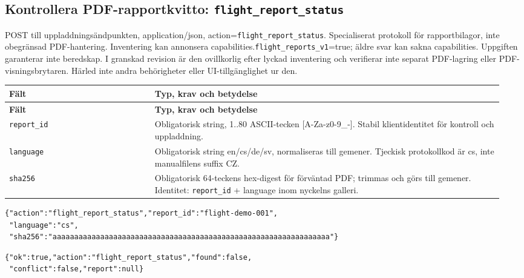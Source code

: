 \documentclass[11pt,a4paper]{article}
\newcommand{\codeword}[1]{\nolinkurl{#1}}
\begin{document}
\subsection{\texorpdfstring{Kontrollera PDF-rapportkvitto: \codeword{flight_report_status}}{Kontrollera PDF-rapportkvitto: flight\_report\_status}}

\label{api352:flight-report-status}

POST till uppladdningsändpunkten, application/json, action=\codeword{flight_report_status}.
Specialiserat protokoll för rapportbilagor, inte obegränsad PDF-hantering. Inventering kan
annonsera capabilities.\codeword{flight_reports_v1}=true; äldre svar kan sakna capabilities.
Uppgiften garanterar inte beredskap. I granskad revision är den ovillkorlig efter lyckad
inventering och verifierar inte separat PDF-lagring eller PDF-visningsbrytaren. Härled inte
andra behörigheter eller UI-tillgänglighet ur den.

\begin{longtable}{@{}>{\RaggedRight\arraybackslash}p{0.28\linewidth}>{\RaggedRight\arraybackslash}p{0.67\linewidth}@{}}
\toprule
\textbf{Fält} & \textbf{Typ, krav och betydelse} \\
\midrule
\endfirsthead
\toprule
\textbf{Fält} & \textbf{Typ, krav och betydelse} \\
\midrule
\endhead
\bottomrule
\endfoot
\codeword{report_id} & Obligatorisk string, 1..80 ASCII-tecken [A-Za-z0-9\_-]. Stabil
klientidentitet för kontroll och uppladdning. \\
\codeword{language} & Obligatorisk string en/cs/de/sv, normaliseras till gemener. Tjeckisk
protokollkod är cs, inte manualfilens suffix CZ. \\
\codeword{sha256} & Obligatorisk 64-teckens hex-digest för förväntad PDF; trimmas och görs
till gemener. Identitet: \codeword{report_id} + language inom nyckelns galleri. \\
\end{longtable}

\begin{lstlisting}[language={}]
{"action":"flight_report_status","report_id":"flight-demo-001",
 "language":"cs",
 "sha256":"aaaaaaaaaaaaaaaaaaaaaaaaaaaaaaaaaaaaaaaaaaaaaaaaaaaaaaaaaaaaaaaa"}
\end{lstlisting}

\begin{lstlisting}[language={}]
{"ok":true,"action":"flight_report_status","found":false,
 "conflict":false,"report":null}
\end{lstlisting}
\end{document}
